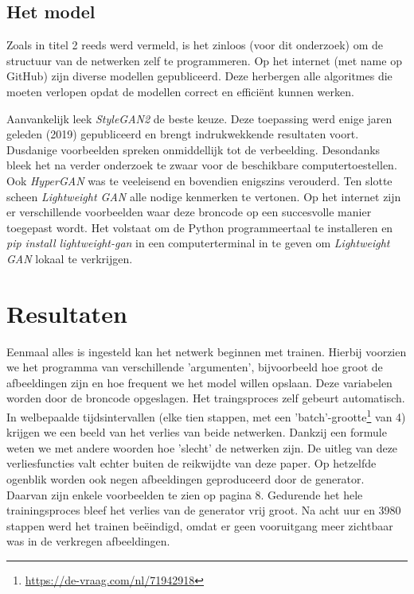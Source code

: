\documentclass[dutch, twoside, a4paper, 10pt]{article}
\begin{document}
\subsection{Het model}
Zoals in titel 2 reeds werd vermeld, is het zinloos (voor dit onderzoek) om de structuur van de netwerken zelf te programmeren. Op het internet (met name op GitHub) zijn diverse modellen gepubliceerd. Deze herbergen alle algoritmes die moeten verlopen opdat de modellen correct en efficiënt kunnen werken.\par\bigskip\noindent
Aanvankelijk leek \textit{StyleGAN2} de beste keuze. Deze toepassing werd enige jaren geleden (2019) gepubliceerd en brengt indrukwekkende resultaten voort. Dusdanige voorbeelden spreken onmiddellijk tot de verbeelding. Desondanks bleek het na verder onderzoek te zwaar voor de beschikbare computertoestellen. Ook \textit{HyperGAN} was te veeleisend en bovendien enigszins verouderd. Ten slotte scheen \textit{Lightweight GAN} alle nodige kenmerken te vertonen. Op het internet zijn er verschillende voorbeelden waar deze broncode op een succesvolle manier toegepast wordt. Het volstaat om de Python programmeertaal te installeren en \textit{pip install lightweight-gan} in een computerterminal in te geven om \textit{Lightweight GAN} lokaal te verkrijgen.

\section{Resultaten}

\noindent Eenmaal alles is ingesteld kan het netwerk beginnen met trainen. Hierbij voorzien we het programma van verschillende 'argumenten', bijvoorbeeld hoe groot de afbeeldingen zijn en hoe frequent we het model willen opslaan. Deze variabelen worden door de broncode opgeslagen. Het traingsproces zelf gebeurt automatisch. In welbepaalde tijdsintervallen (elke tien stappen, met een 'batch'-grootte\footnote{\url{https://de-vraag.com/nl/71942918}} van 4) krijgen we een beeld van het verlies van beide netwerken. Dankzij een formule weten we met andere woorden hoe 'slecht' de netwerken zijn. De uitleg van deze verliesfuncties valt echter buiten de reikwijdte van deze paper. Op hetzelfde ogenblik worden ook negen afbeeldingen geproduceerd door de generator. Daarvan zijn enkele voorbeelden te zien op pagina 8. Gedurende het hele trainingsproces bleef het verlies van de generator vrij groot. Na acht uur en 3980 stappen werd het trainen beëindigd, omdat er geen vooruitgang meer zichtbaar was in de verkregen afbeeldingen.
\end{document}
